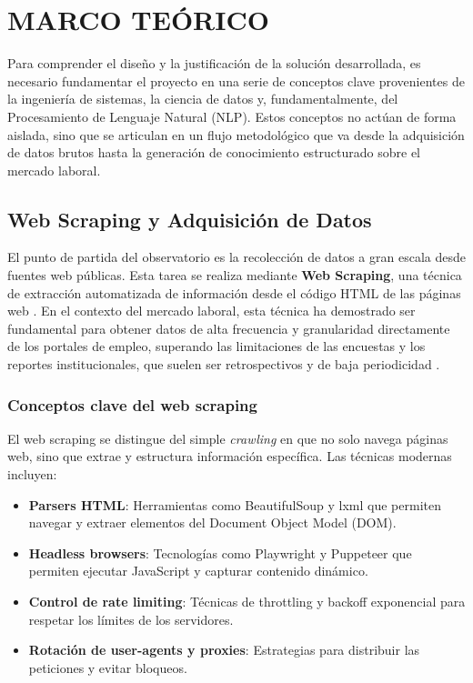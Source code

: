\chapter{MARCO TEÓRICO}

Para comprender el diseño y la justificación de la solución desarrollada, es necesario fundamentar el proyecto en una serie de conceptos clave provenientes de la ingeniería de sistemas, la ciencia de datos y, fundamentalmente, del Procesamiento de Lenguaje Natural (NLP). Estos conceptos no actúan de forma aislada, sino que se articulan en un flujo metodológico que va desde la adquisición de datos brutos hasta la generación de conocimiento estructurado sobre el mercado laboral.

\section{Web Scraping y Adquisición de Datos}

El punto de partida del observatorio es la recolección de datos a gran escala desde fuentes web públicas. Esta tarea se realiza mediante \textbf{Web Scraping}, una técnica de extracción automatizada de información desde el código HTML de las páginas web \cite{orozco2019webscraping}. En el contexto del mercado laboral, esta técnica ha demostrado ser fundamental para obtener datos de alta frecuencia y granularidad directamente de los portales de empleo, superando las limitaciones de las encuestas y los reportes institucionales, que suelen ser retrospectivos y de baja periodicidad \cite{cardenas2015, rubio2024}.

\subsection{Conceptos clave del web scraping}

El web scraping se distingue del simple \textit{crawling} en que no solo navega páginas web, sino que extrae y estructura información específica. Las técnicas modernas incluyen:

\begin{itemize}
    \item \textbf{Parsers HTML}: Herramientas como BeautifulSoup y lxml que permiten navegar y extraer elementos del Document Object Model (DOM).
    \item \textbf{Headless browsers}: Tecnologías como Playwright y Puppeteer que permiten ejecutar JavaScript y capturar contenido dinámico.
    \item \textbf{Control de rate limiting}: Técnicas de throttling y backoff exponencial para respetar los límites de los servidores.
    \item \textbf{Rotación de user-agents y proxies}: Estrategias para distribuir las peticiones y evitar bloqueos.
\end{itemize}

